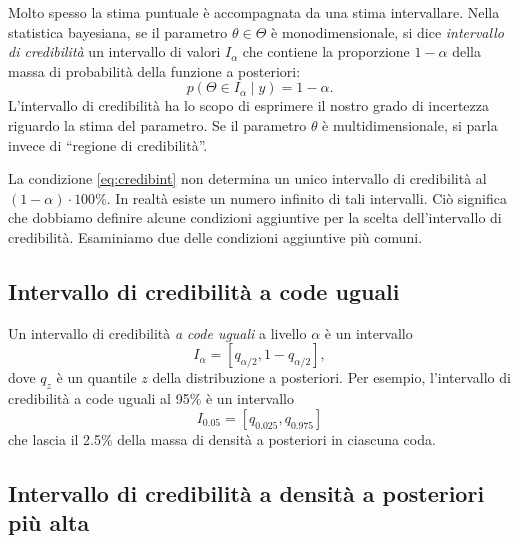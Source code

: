 \documentclass[
  11pt,
  italian,
  a4paper,
  extrafontsizes,onecolumn,openright
  ]{memoir}
\begin{document}
Molto spesso la stima puntuale è accompagnata da una stima intervallare. Nella statistica bayesiana, se il parametro \(\theta \in \Theta\) è monodimensionale, si dice \emph{intervallo di credibilità} un intervallo di valori \(I_{\alpha}\) che contiene la proporzione \(1 - \alpha\) della massa di probabilità della funzione a posteriori:
\begin{equation}
p(\Theta \in I_{\alpha} \mid y) = 1 - \alpha.
\label{eq:credibint}
\end{equation}
L'intervallo di credibilità ha lo scopo di esprimere il nostro grado di incertezza riguardo la stima del parametro. Se il parametro \(\theta\) è multidimensionale, si parla invece di ``regione di credibilità''.

La condizione \eqref{eq:credibint} non determina un unico intervallo di
credibilità al \((1 - \alpha) \cdot 100\%\). In realtà esiste un numero
infinito di tali intervalli. Ciò significa che dobbiamo definire alcune
condizioni aggiuntive per la scelta dell'intervallo di credibilità.
Esaminiamo due delle condizioni aggiuntive più comuni.

\hypertarget{intervallo-di-credibilituxe0-a-code-uguali}{%
\subsection{Intervallo di credibilità a code uguali}\label{intervallo-di-credibilituxe0-a-code-uguali}}

Un intervallo di credibilità \emph{a code uguali} a livello \(\alpha\) è un
intervallo \[I_{\alpha} = [q_{\alpha/2}, 1 - q_{\alpha/2}],\] dove \(q_z\) è un quantile \(z\) della distribuzione a posteriori. Per esempio,
l'intervallo di credibilità a code uguali al 95\% è un intervallo
\[
I_{0.05} = [q_{0.025}, q_{0.975}]
\]
che lascia il 2.5\% della massa di densità a posteriori in ciascuna coda.

\hypertarget{intervallo-di-credibilituxe0-a-densituxe0-a-posteriori-piuxf9-alta}{%
\subsection{Intervallo di credibilità a densità a posteriori più alta}\label{intervallo-di-credibilituxe0-a-densituxe0-a-posteriori-piuxf9-alta}}
\end{document}
